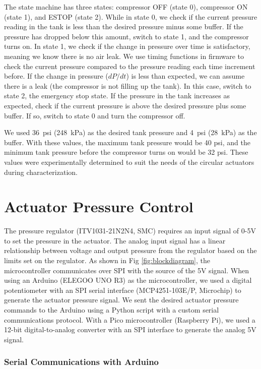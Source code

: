 The state machine has three states: compressor OFF (state 0), compressor ON (state 1), and ESTOP (state 2). While in state 0, we check if the current pressure reading in the tank is less than the desired pressure minus some buffer. If the pressure has dropped below this amount, switch to state 1, and the compressor turns on. In state 1, we check if the change in pressure over time is satisfactory, meaning we know there is no air leak. We use timing functions in firmware to check the current pressure compared to the pressure reading each time increment before. If the change in pressure ($dP/dt$) is less than expected, we can assume there is a leak (the compressor is not filling up the tank). In this case, switch to state 2, the emergency stop state. If the pressure in the tank increases as expected, check if the current pressure is above the desired pressure plus some buffer. If so, switch to state 0 and turn the compressor off. 

We used 36~psi (248~kPa) as the desired tank pressure and 4~psi (28~kPa) as the buffer. With these values, the maximum tank pressure would be 40 psi, and the minimum tank pressure before the compressor turns on would be 32 psi. These values were experimentally determined to suit the needs of the circular actuators during characterization. 

\clearpage
\section{Actuator Pressure Control}

The pressure regulator (ITV1031-21N2N4, SMC) requires an input signal of 0-5V to set the pressure in the actuator. The analog input signal has a linear relationship between voltage and output pressure from the regulator based on the limits set on the regulator. As shown in Fig \ref{fig:blockdiagram}, the microcontroller communicates over SPI with the source of the 5V signal. When using an Arduino (ELEGOO UNO R3) as the microcontroller, we used a digital potentiometer with an SPI serial interface (MCP4251-103E/P, Microchip) to generate the actuator pressure signal. We sent the desired actuator pressure commands to the Arduino using a Python script with a custom serial communications protocol. With a Pico microcontroller (Raspberry Pi), we used a 12-bit digital-to-analog converter with an SPI interface to generate the analog 5V signal. 

\subsubsection{Serial Communications with Arduino}

